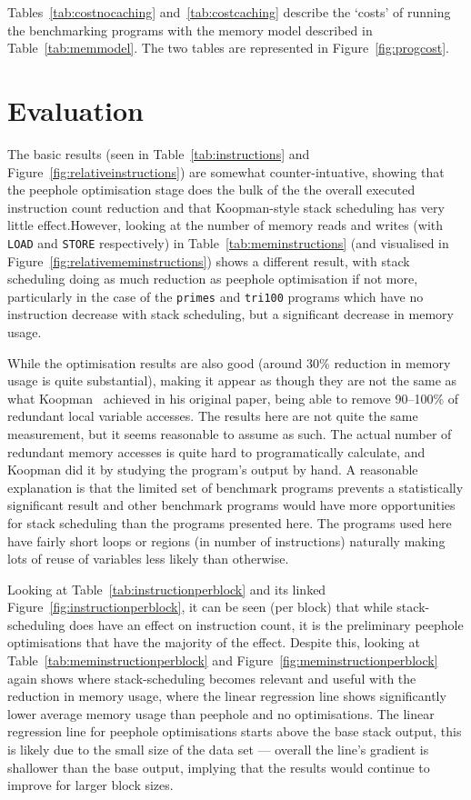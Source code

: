 Tables~\ref{tab:costnocaching} and~\ref{tab:costcaching} describe the `costs' of
running the benchmarking programs with the memory model described in
Table~\ref{tab:memmodel}. The two tables are represented in
Figure~\ref{fig:progcost}.

\section{Evaluation}\label{sec:testingevaluation}
The basic results (seen in Table~\ref{tab:instructions} and
Figure~\ref{fig:relativeinstructions}) are somewhat counter-intuative, showing
that the peephole optimisation stage does the bulk of the the overall executed
instruction count reduction and that Koopman-style stack scheduling has very
little effect.However, looking at the number of memory reads and writes (with
\lstinline{LOAD} and \lstinline{STORE} respectively) in
Table~\ref{tab:meminstructions} (and visualised in
Figure~\ref{fig:relativememinstructions}) shows a different result, with stack
scheduling doing as much reduction as peephole optimisation if not more,
particularly in the case of the \texttt{primes} and \texttt{tri100} programs
which have no instruction decrease with stack scheduling, but a significant
decrease in memory usage.

While the optimisation results are also good (around 30\% reduction in memory
usage is quite substantial), making it appear as though they are not the same as
what Koopman~\cite{Koopman1995Preliminary} achieved in his original paper, being
able to remove 90--100\% of redundant local variable accesses. The results here
are not quite the same measurement, but it seems reasonable to assume as such.
The actual number of redundant memory accesses is quite hard to programatically
calculate, and Koopman did it by studying the program's output by hand. A
reasonable explanation is that the limited set of benchmark programs prevents a
statistically significant result and other benchmark programs would have more
opportunities for stack scheduling than the programs presented here. The
programs used here have fairly short loops or regions (in number of
instructions) naturally making lots of reuse of variables less likely than
otherwise.

Looking at Table~\ref{tab:instructionperblock} and its linked
Figure~\ref{fig:instructionperblock}, it can be seen (per block) that while
stack-scheduling does have an effect on instruction count, it is the preliminary
peephole optimisations that have the majority of the effect. Despite this,
looking at Table~\ref{tab:meminstructionperblock} and
Figure~\ref{fig:meminstructionperblock} again shows where stack-scheduling
becomes relevant and useful with the reduction in memory usage, where the linear
regression line shows significantly lower average memory usage than peephole and
no optimisations. The linear regression line for peephole optimisations starts
above the base stack output, this is likely due to the small size of the data
set --- overall the line's gradient is shallower than the base output, implying
that the results would continue to improve for larger block sizes.


